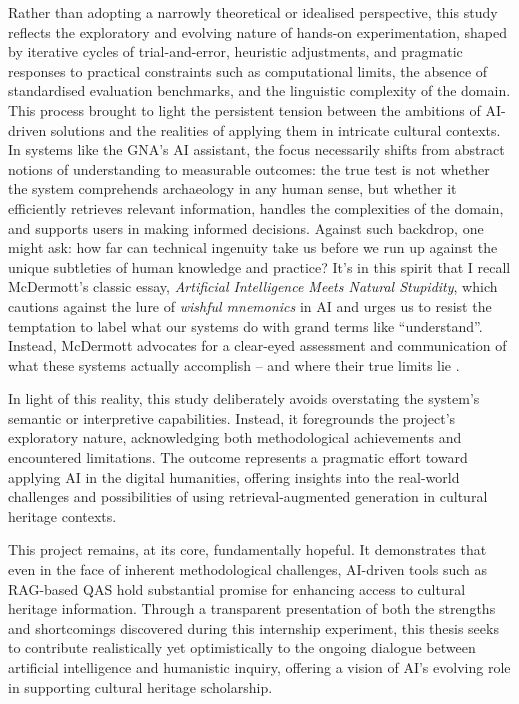 \begin{spacing}{1.5}
Rather than adopting a narrowly theoretical or idealised perspective, this study reflects the exploratory and evolving nature of hands-on experimentation, shaped by iterative cycles of trial-and-error, heuristic adjustments, and pragmatic responses to practical constraints such as computational limits, the absence of standardised evaluation benchmarks, and the linguistic complexity of the domain. This process brought to light the persistent tension between the ambitions of AI-driven solutions and the realities of applying them in intricate cultural contexts. In systems like the GNA’s AI assistant, the focus necessarily shifts from abstract notions of understanding to measurable outcomes: the true test is not whether the system comprehends archaeology in any human sense, but whether it efficiently retrieves relevant information, handles the complexities of the domain, and supports users in making informed decisions. Against such backdrop, one might ask: how far can technical ingenuity take us before we run up against the unique subtleties of human knowledge and practice? It’s in this spirit that I recall McDermott’s classic essay, \textit{Artificial Intelligence Meets Natural Stupidity}, which cautions against the lure of \textit{wishful mnemonics} in AI and urges us to resist the temptation to label what our systems do with grand terms like “understand”. Instead, McDermott advocates for a clear-eyed assessment and communication of what these systems actually accomplish -- and where their true limits lie \citep{mcdermott_artificial_1976}.

In light of this reality, this study deliberately avoids overstating the system’s semantic or interpretive capabilities. Instead, it foregrounds the project’s exploratory nature, acknowledging both methodological achievements and encountered limitations. The outcome represents a pragmatic effort toward applying AI in the digital humanities, offering insights into the real-world challenges and possibilities of using retrieval-augmented generation in cultural heritage contexts.

This project remains, at its core, fundamentally hopeful. It demonstrates that even in the face of inherent methodological challenges, AI-driven tools such as RAG-based QAS hold substantial promise for enhancing access to cultural heritage information. Through a transparent presentation of both the strengths and shortcomings discovered during this internship experiment, this thesis seeks to contribute realistically yet optimistically to the ongoing dialogue between artificial intelligence and humanistic inquiry, offering a vision of AI’s evolving role in supporting cultural heritage scholarship.

\end{spacing}